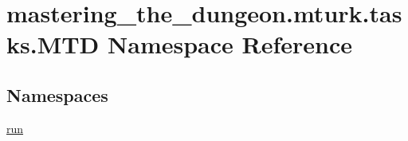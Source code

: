 \hypertarget{namespacemastering__the__dungeon_1_1mturk_1_1tasks_1_1MTD}{}\section{mastering\+\_\+the\+\_\+dungeon.\+mturk.\+tasks.\+M\+TD Namespace Reference}
\label{namespacemastering__the__dungeon_1_1mturk_1_1tasks_1_1MTD}
\subsection*{Namespaces}
\begin{DoxyCompactItemize}
\item 
 \hyperlink{namespacemastering__the__dungeon_1_1mturk_1_1tasks_1_1MTD_1_1run}{run}
\end{DoxyCompactItemize}
